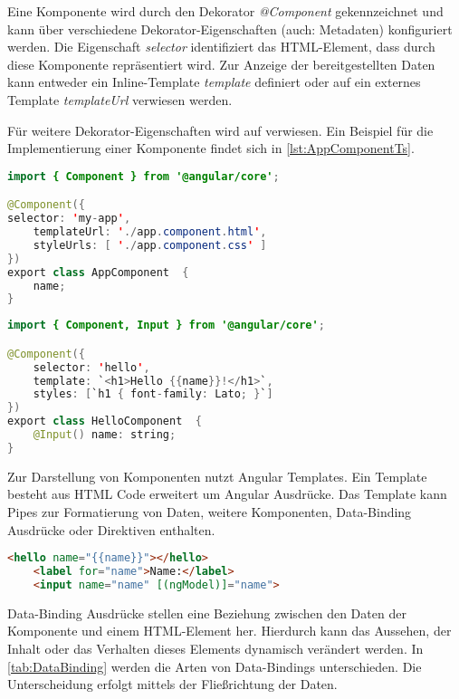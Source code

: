 Eine Komponente wird durch den Dekorator \textit{@Component} gekennzeichnet und kann über verschiedene Dekorator-Eigenschaften (auch: Metadaten) konfiguriert werden. Die Eigenschaft \textit{selector} identifiziert das HTML-Element, dass durch diese Komponente repräsentiert wird. Zur Anzeige der bereitgestellten Daten kann entweder ein Inline-Template \textit{template} definiert oder auf ein externes Template \textit{templateUrl} verwiesen werden. \autocites[vgl.][]{Google.b}[vgl.][405]{Freeman.2018}[vgl.][47\psqq]{Steyer.2017} 

Für weitere Dekorator-Eigenschaften wird auf \textcite[405]{Freeman.2018} verwiesen. Ein Beispiel für die Implementierung einer Komponente findet sich in \autoref{lst:AppComponentTs}.

\begin{lstlisting}[caption=Die Komponente AppComponent in der Datei app.component.ts, label=lst:AppComponentTs, language=Java]
import { Component } from '@angular/core';

@Component({
selector: 'my-app',
	templateUrl: './app.component.html',
	styleUrls: [ './app.component.css' ]
})
export class AppComponent  {
	name;
}
\end{lstlisting}

\begin{lstlisting}[caption=Die Komponente HelloComponent in der Datei hello.component.ts, label=lst:HelloComponentTs, language=Java]
import { Component, Input } from '@angular/core';

@Component({
	selector: 'hello',
	template: `<h1>Hello {{name}}!</h1>`,
	styles: [`h1 { font-family: Lato; }`]
})
export class HelloComponent  {
	@Input() name: string;
}
\end{lstlisting}


Zur Darstellung von Komponenten nutzt Angular Templates. Ein Template besteht aus HTML Code erweitert um Angular Ausdrücke. Das Template kann Pipes zur Formatierung von Daten, weitere Komponenten, Data-Binding Ausdrücke oder Direktiven enthalten. \autocites[vgl.][]{Google.b}[vgl.][52]{Steyer.2017} 

\begin{lstlisting}[caption=Das Template in der Datei app.component.html, label=lst:AppComponentHTML, language=HTML]
	<hello name="{{name}}"></hello>
	<label for="name">Name:</label>
	<input name="name" [(ngModel)]="name">
\end{lstlisting}

Data-Binding Ausdrücke stellen eine Beziehung zwischen den Daten der Komponente und einem HTML-Element her. Hierdurch kann das Aussehen, der Inhalt oder das Verhalten dieses Elements dynamisch verändert werden. In \autoref{tab:DataBinding} werden die Arten von Data-Bindings unterschieden. Die Unterscheidung erfolgt mittels der Fließrichtung der Daten. 

